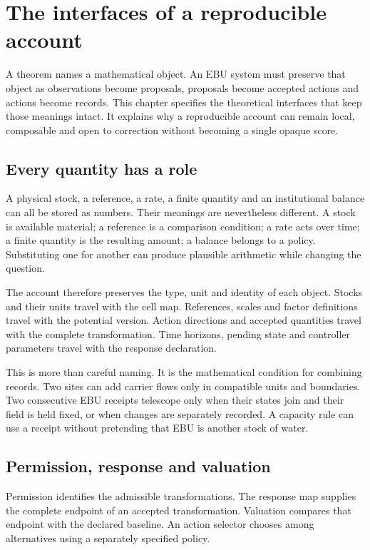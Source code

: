 \chapter{The interfaces of a reproducible account}\label{ch:implementation}

A theorem names a mathematical object. An EBU system must preserve that object as observations become proposals, proposals become accepted actions and actions become records. This chapter specifies the theoretical interfaces that keep those meanings intact. It explains why a reproducible account can remain local, composable and open to correction without becoming a single opaque score.

\section{Every quantity has a role}
A physical stock, a reference, a rate, a finite quantity and an institutional balance can all be stored as numbers. Their meanings are nevertheless different. A stock is available material; a reference is a comparison condition; a rate acts over time; a finite quantity is the resulting amount; a balance belongs to a policy. Substituting one for another can produce plausible arithmetic while changing the question.

The account therefore preserves the type, unit and identity of each object. Stocks and their units travel with the cell map. References, scales and factor definitions travel with the potential version. Action directions and accepted quantities travel with the complete transformation. Time horizons, pending state and controller parameters travel with the response declaration.

This is more than careful naming. It is the mathematical condition for combining records. Two sites can add carrier flows only in compatible units and boundaries. Two consecutive EBU receipts telescope only when their states join and their field is held fixed, or when changes are separately recorded. A capacity rule can use a receipt without pretending that EBU is another stock of water.

\section{Permission, response and valuation}
Permission identifies the admissible transformations. The response map supplies the complete endpoint of an accepted transformation. Valuation compares that endpoint with the declared baseline. An action selector chooses among alternatives using a separately specified policy.

